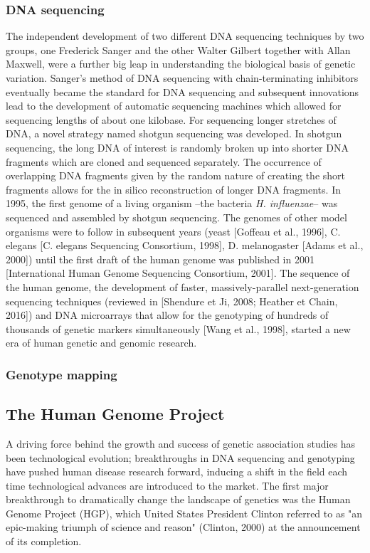 \subsubsection{DNA sequencing}
The independent development of two different DNA sequencing techniques by two groups, one Frederick Sanger and the other Walter Gilbert together with Allan Maxwell, were a further big leap in understanding the biological basis of genetic variation. 
Sanger’s method of DNA sequencing with chain-terminating inhibitors eventually became the standard for DNA sequencing and subsequent innovations lead to the development of automatic sequencing machines which allowed for sequencing lengths of about one kilobase. 
For sequencing longer stretches of DNA, a novel strategy named shotgun sequencing was developed. 
In shotgun sequencing, the long DNA of interest is randomly broken up into shorter DNA fragments which are cloned and sequenced separately. 
The occurrence of overlapping DNA fragments given by the random nature of creating the short fragments allows for the in silico reconstruction of longer DNA fragments.
In 1995, the first genome of a living organism –the bacteria \textit{H. influenzae}– was sequenced and assembled by shotgun sequencing. 
The genomes of other model organisms were to follow in subsequent years (yeast [Goffeau et al., 1996], C. elegans [C. elegans Sequencing Consortium, 1998], D. melanogaster [Adams et al., 2000]) until the first draft of the human genome was published in 2001 [International Human Genome Sequencing Consortium, 2001].
The sequence of the human genome, the development of faster, massively-parallel next-generation sequencing techniques (reviewed in [Shendure et Ji, 2008; Heather et Chain, 2016]) and DNA microarrays that allow for the genotyping of hundreds of thousands of genetic markers simultaneously [Wang et al., 1998], started a new era of human genetic and genomic research.


\subsubsection{Genotype mapping}

\subsection{The Human Genome Project}

A driving force behind the growth and success of genetic association studies has been technological evolution; breakthroughs in DNA sequencing and genotyping have pushed human disease research forward, inducing a shift in the field each time technological
advances are introduced to the market. 
The first major breakthrough to dramatically change the landscape of genetics was the Human Genome Project (HGP), which United States President Clinton referred to as "an epic-making triumph of science and reason" (Clinton, 2000) at the announcement of its completion.\\

